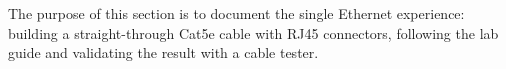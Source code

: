 The purpose of this section is to document the single Ethernet experience:
building a straight-through Cat5e cable with RJ45 connectors, following the
lab guide and validating the result with a cable tester.


